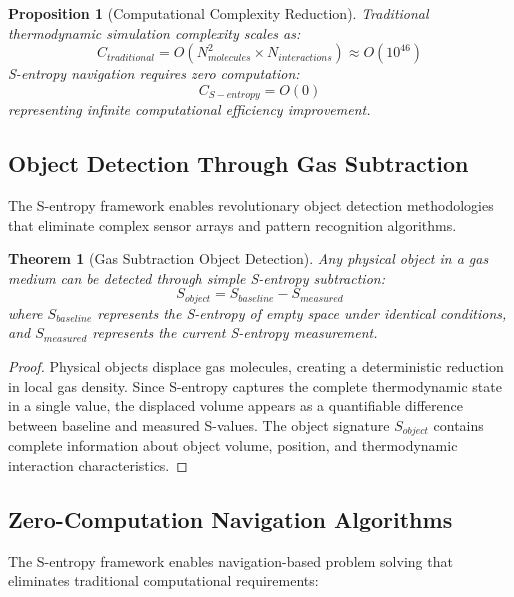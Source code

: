 \documentclass[12pt,a4paper]{article}
\newtheorem{theorem}{Theorem}
\newtheorem{proposition}{Proposition}
\begin{document}
\begin{proposition}[Computational Complexity Reduction]
Traditional thermodynamic simulation complexity scales as:
\begin{equation}
C_{traditional} = O(N_{molecules}^2 \times N_{interactions}) \approx O(10^{46})
\end{equation}
S-entropy navigation requires zero computation:
\begin{equation}
C_{S-entropy} = O(0)
\end{equation}
representing infinite computational efficiency improvement.
\end{proposition}

\subsection{Object Detection Through Gas Subtraction}

The S-entropy framework enables revolutionary object detection methodologies that eliminate complex sensor arrays and pattern recognition algorithms.

\begin{theorem}[Gas Subtraction Object Detection]
Any physical object in a gas medium can be detected through simple S-entropy subtraction:
\begin{equation}
S_{object} = S_{baseline} - S_{measured}
\end{equation}
where $S_{baseline}$ represents the S-entropy of empty space under identical conditions, and $S_{measured}$ represents the current S-entropy measurement.
\end{theorem}

\begin{proof}
Physical objects displace gas molecules, creating a deterministic reduction in local gas density. Since S-entropy captures the complete thermodynamic state in a single value, the displaced volume appears as a quantifiable difference between baseline and measured S-values. The object signature $S_{object}$ contains complete information about object volume, position, and thermodynamic interaction characteristics.
\end{proof}

\subsection{Zero-Computation Navigation Algorithms}

The S-entropy framework enables navigation-based problem solving that eliminates traditional computational requirements:
\end{document}
